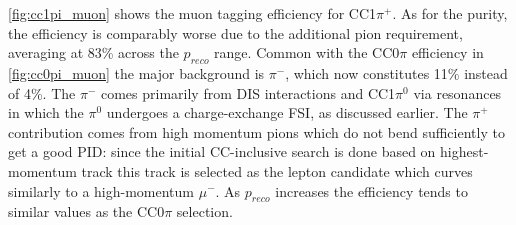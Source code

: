 \autoref{fig:cc1pi_muon} shows the muon tagging efficiency for CC1$\pi^+$. As for the purity, the efficiency is comparably worse due to the additional pion requirement, averaging at 83\% across the $p_{reco}$ range. Common with the CC0$\pi$ efficiency in \autoref{fig:cc0pi_muon} the major background is $\pi^-$, which now constitutes 11\% instead of 4\%. The $\pi^-$ comes primarily from DIS interactions and CC1$\pi^0$ via resonances in which the $\pi^0$ undergoes a charge-exchange FSI, as discussed earlier. The $\pi^+$ contribution comes from high momentum pions which do not bend sufficiently to get a good PID: since the initial CC-inclusive search is done based on highest-momentum track this track is selected as the lepton candidate which curves similarly to a high-momentum $\mu^-$. As $p_{reco}$ increases the efficiency tends to similar values as the CC0$\pi$ selection.

